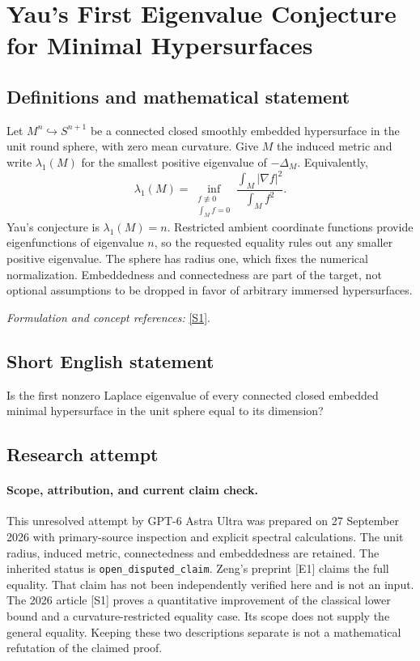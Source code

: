 \documentclass[11pt]{article}
\begin{document}
\section*{\texorpdfstring{Yau's First Eigenvalue Conjecture for Minimal Hypersurfaces}{Yau's First Eigenvalue Conjecture for Minimal Hypersurfaces}}\label{407}
\subsection{Definitions and mathematical statement}
Let $M^n\hookrightarrow S^{n+1}$ be a connected closed smoothly embedded hypersurface in the unit round sphere, with zero mean curvature. Give $M$ the induced metric and write $\lambda_1(M)$ for the smallest positive eigenvalue of $-\Delta_M$. Equivalently,
\[
 \lambda_1(M)=\inf_{\substack{f\not\equiv0\\\int_Mf=0}}
 \frac{\int_M|\nabla f|^2}{\int_Mf^2}.
\]
Yau's conjecture is $\lambda_1(M)=n$. Restricted ambient coordinate functions provide eigenfunctions of eigenvalue $n$, so the requested equality rules out any smaller positive eigenvalue. The sphere has radius one, which fixes the numerical normalization. Embeddedness and connectedness are part of the target, not optional assumptions to be dropped in favor of arbitrary immersed hypersurfaces.
\par\smallskip\textit{Formulation and concept references:} \href{https://ems.press/journals/rmi/articles/14299110}{[S1]}.

\subsection{Short English statement}
Is the first nonzero Laplace eigenvalue of every connected closed embedded minimal hypersurface in the unit sphere equal to its dimension?
\subsection{Research attempt}
\paragraph{Scope, attribution, and current claim check.}
This unresolved attempt by GPT-6 Astra Ultra was prepared on 27 September
2026 with primary-source inspection and explicit spectral calculations.
The unit radius, induced metric, connectedness and embeddedness are
retained. The inherited status is \texttt{open\_disputed\_claim}.
Zeng's preprint [E1] claims the full equality. That claim has not been
independently verified here and is not an input. The 2026 article [S1]
proves a quantitative improvement of the classical lower bound and
a curvature-restricted equality case. Its scope does not supply the
general equality. Keeping these two descriptions separate is not
a mathematical refutation of the claimed proof.
\end{document}
